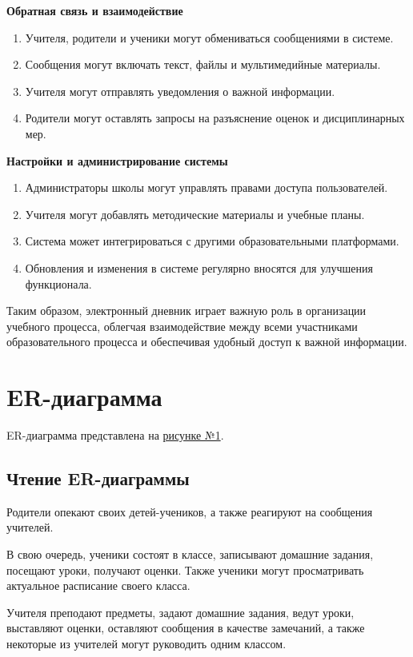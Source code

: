 \documentclass[a4paper, final]{article}
\begin{document}
\noindent \textbf{Обратная связь и взаимодействие}
\begin{enumerate}
  \item Учителя, родители и ученики могут обмениваться сообщениями в системе.
  \item Сообщения могут включать текст, файлы и мультимедийные материалы.
  \item Учителя могут отправлять уведомления о важной информации.
  \item Родители могут оставлять запросы на разъяснение оценок и дисциплинарных мер.
\end{enumerate}


\noindent \textbf{Настройки и администрирование системы}
\begin{enumerate}
  \item Администраторы школы могут управлять правами доступа пользователей.
  \item Учителя могут добавлять методические материалы и учебные планы.
  \item Система может интегрироваться с другими образовательными платформами.
  \item Обновления и изменения в системе регулярно вносятся для улучшения функционала.
\end{enumerate}
  
Таким образом, электронный дневник играет важную роль в организации учебного процесса, облегчая взаимодействие между всеми участниками образовательного процесса и обеспечивая удобный доступ к важной информации.

\section{ER-диаграмма}
ER-диаграмма представлена на \hyperlink{diag:erd}{рисунке №1}.
% 

\subsection{Чтение ER-диаграммы}
Родители опекают своих детей-учеников, а также реагируют на сообщения учителей.

В свою очередь, ученики состоят в классе, записывают домашние задания, посещают уроки, получают оценки. Также ученики могут просматривать актуальное расписание своего класса.

Учителя преподают предметы, задают домашние задания, ведут уроки, выставляют оценки, оставляют сообщения в качестве замечаний, а также некоторые из учителей могут руководить одним классом.
\end{document}
